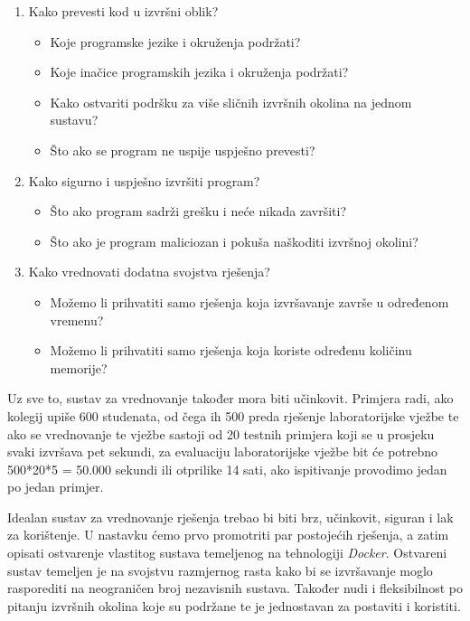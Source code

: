 \documentclass[times, utf8, zavrsni]{fer}
\begin{document}
\begin{enumerate}
\item Kako prevesti kod u izvršni oblik?
	\begin{itemize}
	\item Koje programske jezike i okruženja podržati?
	\item Koje inačice programskih jezika i okruženja podržati?
	\item Kako ostvariti podršku za više sličnih izvršnih okolina na jednom sustavu?
	\item Što ako se program ne uspije uspješno prevesti?
	\end{itemize}
\item Kako sigurno i uspješno izvršiti program?
	\begin{itemize}
	\item Što ako program sadrži grešku i neće nikada završiti?
	\item Što ako je program maliciozan i pokuša naškoditi izvršnoj okolini?
	\end{itemize}
\item Kako vrednovati dodatna svojstva rješenja?
	\begin{itemize}
	\item Možemo li prihvatiti samo rješenja koja izvršavanje završe u određenom vremenu?
	\item Možemo li prihvatiti samo rješenja koja koriste određenu količinu memorije?
	\end{itemize}
\end{enumerate}

Uz sve to, sustav za vrednovanje također mora biti učinkovit. Primjera radi, ako kolegij upiše 600 studenata, od čega ih 500 preda rješenje laboratorijske vježbe te ako se vrednovanje te vježbe sastoji od 20 testnih primjera koji se u prosjeku svaki izvršava pet sekundi, za evaluaciju laboratorijske vježbe bit će potrebno 500*20*5 = 50.000 sekundi ili otprilike 14 sati, ako ispitivanje provodimo jedan po jedan primjer.

Idealan sustav za vrednovanje rješenja trebao bi biti brz, učinkovit, siguran i lak za korištenje. U nastavku ćemo prvo promotriti par postojećih rješenja, a zatim opisati ostvarenje vlastitog sustava temeljenog na tehnologiji {\textit{Docker}}. Ostvareni sustav temeljen je na svojstvu razmjernog rasta kako bi se izvršavanje moglo rasporediti na neograničen broj nezavisnih sustava. Također nudi i fleksibilnost po pitanju izvršnih okolina koje su podržane te je jednostavan za postaviti i koristiti.
\end{document}
